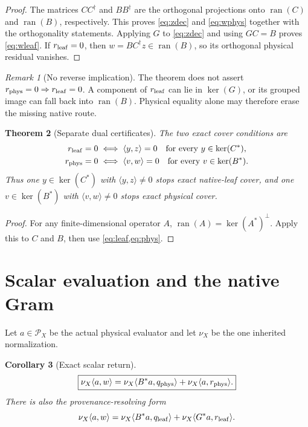 \documentclass[11pt]{article}
\newtheorem{theorem}{Theorem}[section]
\newtheorem{corollary}[theorem]{Corollary}
\theoremstyle{definition}
\theoremstyle{remark}
\newtheorem{remark}[theorem]{Remark}
\newcommand{\cP}{\mathcal P}
\newcommand{\Ran}{\operatorname{ran}}
\newcommand{\Ker}{\operatorname{ker}}
\begin{document}
\begin{proof}
The matrices \(CC^\dagger\) and \(BB^\dagger\) are the orthogonal
projections onto \(\Ran(C)\) and \(\Ran(B)\), respectively.  This
proves \eqref{eq:zdec} and \eqref{eq:wphys} together with the
orthogonality statements.  Applying \(G\) to \eqref{eq:zdec} and
using \(GC=B\) proves \eqref{eq:wleaf}.  If \(r_{\rm leaf}=0\), then
\(w=BC^\dagger z\in\Ran(B)\), so its orthogonal physical residual
vanishes.
\end{proof}

\begin{remark}[No reverse implication]
The theorem does not assert
\(r_{\rm phys}=0\Rightarrow r_{\rm leaf}=0\).  A component of
\(r_{\rm leaf}\) can lie in \(\Ker(G)\), or its grouped image can fall
back into \(\Ran(B)\).  Physical equality alone may therefore erase
the missing native route.
\end{remark}

\begin{theorem}[Separate dual certificates]
\label{thm:dual}
The two exact cover conditions are
\begin{align*}
 r_{\rm leaf}=0
 &\iff
 \langle y,z\rangle=0
 \quad\text{for every }y\in\Ker(C^*),\\
 r_{\rm phys}=0
 &\iff
 \langle v,w\rangle=0
 \quad\text{for every }v\in\Ker(B^*).
\end{align*}
Thus one \(y\in\Ker(C^*)\) with
\(\langle y,z\rangle\ne0\) stops exact native-leaf cover, and one
\(v\in\Ker(B^*)\) with \(\langle v,w\rangle\ne0\) stops exact physical
cover.
\end{theorem}

\begin{proof}
For any finite-dimensional operator \(A\),
\(\Ran(A)=\Ker(A^*)^\perp\).  Apply this to \(C\) and \(B\), then use
\cref{eq:leaf,eq:phys}.
\end{proof}

\section{Scalar evaluation and the native Gram}

Let \(a\in\cP_X\) be the actual physical evaluator and let \(\nu_X\)
be the one inherited normalization.

\begin{corollary}[Exact scalar return]
\label{cor:scalar}
\[
 \boxed{
 \nu_X\langle a,w\rangle
 =
 \nu_X\langle B^*a,q_{\rm phys}\rangle
 +
 \nu_X\langle a,r_{\rm phys}\rangle.}
\]
There is also the provenance-resolving form
\[
 \nu_X\langle a,w\rangle
 =
 \nu_X\langle B^*a,q_{\rm leaf}\rangle
 +
 \nu_X\langle G^*a,r_{\rm leaf}\rangle.
\]
\end{corollary}
\end{document}
